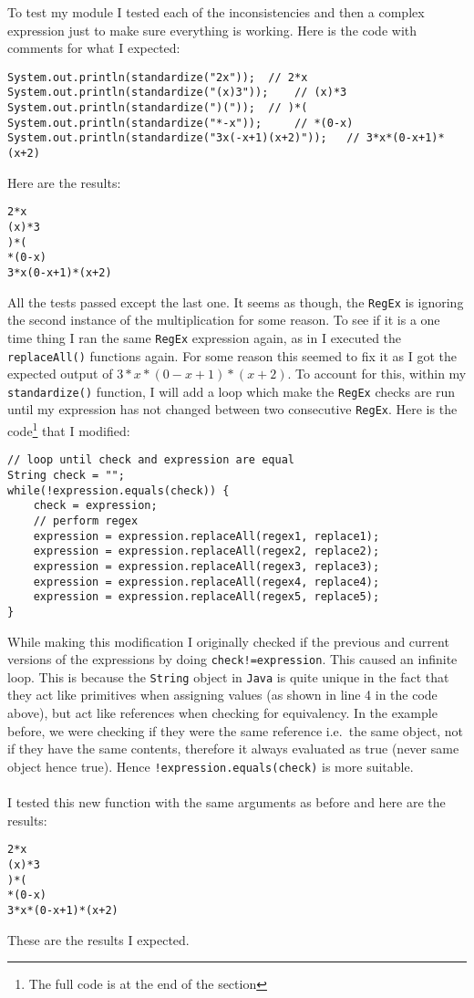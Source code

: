 \documentclass[../../../../main.tex]{subfiles}
\begin{document}
\newpage\noindent
To test my module I tested each of the inconsistencies and then a complex expression just to make sure everything is working. Here is the code with comments for what I expected:
\begin{verbatim}
System.out.println(standardize("2x"));	// 2*x
System.out.println(standardize("(x)3"));	// (x)*3
System.out.println(standardize(")("));	// )*(
System.out.println(standardize("*-x"));		// *(0-x)
System.out.println(standardize("3x(-x+1)(x+2)"));	// 3*x*(0-x+1)*(x+2)
\end{verbatim}
Here are the results:
\begin{verbatim}
2*x
(x)*3
)*(
*(0-x)
3*x(0-x+1)*(x+2)
\end{verbatim}
All the tests passed except the last one. It seems as though, the \texttt{RegEx} is ignoring the second instance of the multiplication for some reason. To see if it is a one time thing I ran the same \texttt{RegEx} expression again, as in I executed the \texttt{replaceAll()} functions again. For some reason this seemed to fix it as I got the expected output of $3*x*(0-x+1)*(x+2)$. To account for this, within my \texttt{standardize()} function, I will add a loop which make the \texttt{RegEx} checks are run until my expression has not changed between two consecutive \texttt{RegEx}. Here is the code\footnote{The full code is at the end of the section} that I modified:
\begin{verbatim}
// loop until check and expression are equal
String check = "";
while(!expression.equals(check)) {
	check = expression;
	// perform regex
	expression = expression.replaceAll(regex1, replace1);
	expression = expression.replaceAll(regex2, replace2);
	expression = expression.replaceAll(regex3, replace3);
	expression = expression.replaceAll(regex4, replace4);
	expression = expression.replaceAll(regex5, replace5);			
}
\end{verbatim}
While making this modification I originally checked if the previous and current versions of the expressions by doing \texttt{check!=expression}. This caused an infinite loop. This is because the \texttt{String} object in \texttt{Java} is quite unique in the fact that they act like primitives when assigning values (as shown in line 4 in the code above), but act like references when checking for equivalency\cite{javaString}. In the example before, we were checking if they were the same reference i.e.\ the same object, not if they have the same contents, therefore it always evaluated as true (never same object hence true). Hence \texttt{!expression.equals(check)} is more suitable.\\ \\
I tested this new function with the same arguments as before and here are the results:
\begin{verbatim}
2*x
(x)*3
)*(
*(0-x)
3*x*(0-x+1)*(x+2)
\end{verbatim}
These are the results I expected.
\newpage
\end{document}
